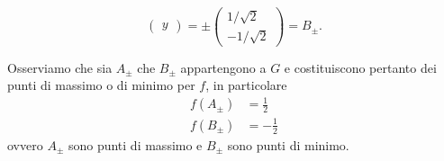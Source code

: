 \begin{ese}
\begin{itemize}
\[\begin{pmatrix}
				      y
			      \end{pmatrix}
			      =\pm
			      \begin{pmatrix}
				      1/\sqrt{2} \\
				      -1/\sqrt{2}
			      \end{pmatrix}
			      =B_\pm.
		      \]
	\end{itemize}
	Osserviamo che sia \(A_\pm\) che \(B_\pm\) appartengono a \(G\) e costituiscono pertanto dei punti di massimo o di minimo per \(f\), in particolare
	\begin{align*}
		f(A_\pm) & = \frac{1}{2}  \\
		f(B_\pm) & = -\frac{1}{2}
	\end{align*}
	ovvero \(A_\pm\) sono punti di massimo e \(B_\pm\) sono punti di minimo.
\end{ese}


